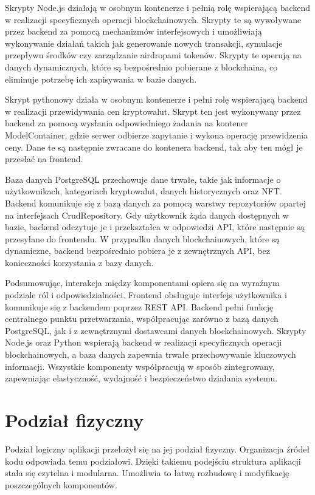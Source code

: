 Skrypty Node.js działają w osobnym kontenerze i pełnią rolę wspierającą backend w realizacji specyficznych operacji blockchainowych. Skrypty te są wywoływane przez backend za pomocą mechanizmów interfejsowych i umożliwiają wykonywanie działań takich jak generowanie nowych transakcji, symulacje przepływu środków czy zarządzanie airdropami tokenów. Skrypty te operują na danych dynamicznych, które są bezpośrednio pobierane z blockchaina, co eliminuje potrzebę ich zapisywania w bazie danych.

Skrypt pythonowy działa w osobnym kontenerze i pełni rolę wspierającą backend w realizacji przewidywania cen kryptowalut. Skrypt ten jest wykonywany przez backend za pomocą wysłania odpowiedniego żadania na kontener ModelContainer, gdzie serwer odbierze zapytanie i wykona operację przewidzenia ceny. Dane te są następnie zwracane do kontenera backend, tak aby ten mógł je przesłać na frontend.

Baza danych PostgreSQL przechowuje dane trwałe, takie jak informacje o użytkownikach, kategoriach kryptowalut, danych historycznych oraz NFT. Backend komunikuje się z bazą danych za pomocą warstwy repozytoriów opartej na interfejsach CrudRepository. Gdy użytkownik żąda danych dostępnych w bazie, backend odczytuje je i przekształca w odpowiedzi API, które następnie są przesyłane do frontendu. W przypadku danych blockchainowych, które są dynamiczne, backend bezpośrednio pobiera je z zewnętrznych API, bez konieczności korzystania z bazy danych.

Podsumowując, interakcja między komponentami opiera się na wyraźnym podziale ról i odpowiedzialności. Frontend obsługuje interfejs użytkownika i komunikuje się z backendem poprzez REST API. Backend pełni funkcję centralnego punktu przetwarzania, współpracując zarówno z bazą danych PostgreSQL, jak i z zewnętrznymi dostawcami danych blockchainowych. Skrypty Node.js oraz Python wspierają backend w realizacji specyficznych operacji blockchainowych, a baza danych zapewnia trwałe przechowywanie kluczowych informacji. Wszystkie komponenty współpracują w sposób zintegrowany, zapewniając elastyczność, wydajność i bezpieczeństwo działania systemu.

\section{Podział fizyczny}
Podział logiczny aplikacji przełożył się na jej podział fizyczny. Organizacja źródeł kodu odpowiada temu podziałowi. Dzięki takiemu podejściu struktura aplikacji stała się czytelna i modularna. Umożliwia to łatwą rozbudowę i modyfikację poszczególnych komponentów. 

